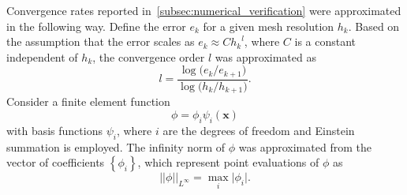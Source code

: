\documentclass[fleqn]{wlscirep}
\newcommand{\normlinf}[1]{{\vert\vert#1\vert\vert}_{L^{\infty}}}
\newcommand{\xx}{\bm{x}}
\begin{document}
Convergence rates reported in~\cref{subsec:numerical_verification} were approximated in the following way. Define the error $e_k$ for a given mesh resolution $h_k$. Based on the assumption that the error scales as $e_k \approx C{h_k}^l$, where $C$ is a constant independent of $h_k$, the convergence order $l$ was approximated as
\begin{equation}
    l = \frac{\log{(e_k/e_{k+1}})}{\log{(h_k/h_{k+1}})}.
    \label{eq:convergence_order_estimate}
\end{equation}
Consider a finite element function 
\begin{equation*}
    \phi = \phi_i\psi_i(\xx)
\end{equation*}
with basis functions $\psi_i$, where $i$ are the degrees of freedom and Einstein summation is employed. The infinity norm of $\phi$ was approximated from the vector
of coefficients $\left\{\phi_i\right\}$, which represent point evaluations of $\phi$ as
\begin{equation*}
    \normlinf{\phi} = \max_i{\vert \phi_i\vert}.
\end{equation*}
\end{document}
